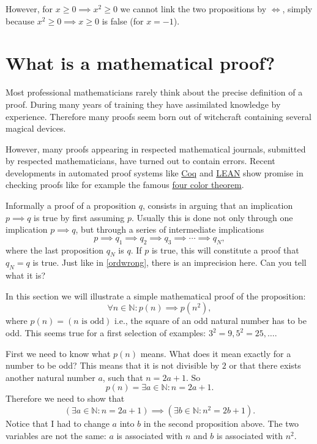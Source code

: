 However, for $x \geq 0 \implies x^2 \geq 0$ we cannot link the two propositions by $\iff$,
simply because $x^2 \geq 0 \implies x \geq 0$ is false (for $x= -1$).

\section{What is a mathematical proof?}

Most professional mathematicians rarely think about the precise
definition of a proof. During many years of training they have
assimilated knowledge by experience. Therefore many proofs
seem born out of witchcraft containing several magical
devices.

However, many proofs appearing in
respected mathematical journals, submitted by respected mathematicians, have turned out to contain
errors. Recent developments in automated proof systems
like \href{https://en.wikipedia.org/wiki/Coq}{Coq} and \href{https://en.wikipedia.org/wiki/Lean\_(proof\_assistant)}{LEAN} show
promise in checking proofs like for example the famous
\href{https://en.wikipedia.org/wiki/Four\_color\_theorem}{four color theorem}.

Informally a proof of a proposition $q$, consists in arguing that an implication $p\implies q$ is true by first assuming $p$. Usually this is done
not only through one implication $p\implies q$, but through a series
of intermediate implications
$$
  p\implies q_1 \implies q_2 \implies q_3 \implies \cdots \implies q_N,
$$
where the last proposition $q_N$ is $q$. If $p$ is true, this
will constitute a proof that $q_N = q$ is true. Just like in \eqref{ordwrong},
there is an imprecision here. Can you tell what it is?

In this section we will illustrate a simple mathematical proof of the
proposition:
$$
  \forall n\in \mathbb{N}: p(n)\implies p(n^2),
$$
where $p(n) = (n\text{ is odd})$ i.e., the square of an odd
natural number has to be odd. This seems true for a first selection
of examples: $3^2=9, 5^2=25, \dots$.

First we need to know what $p(n)$ means. What does it mean
exactly for a number to be odd? This means that it is
not divisible by $2$ or that there exists another
natural number $a$, such that $n = 2 a + 1$. So
$$
  p(n) = \exists a\in \mathbb{N}: n = 2 a + 1.
$$
Therefore we need to show that
$$
  \left(\exists a\in \mathbb{N}: n = 2 a + 1\right) \implies
  \left(\exists b\in \mathbb{N}: n^2 = 2 b + 1\right).
$$
Notice that I had to change $a$ into $b$ in the second proposition above.
The two variables are not the same: $a$ is associated with $n$ and
$b$ is associated with $n^2$.

